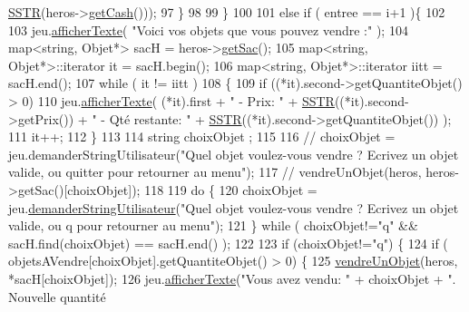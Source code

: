 \begin{DoxyCode}
      \hyperlink{superette_8cpp_a0d2f37137ee1fd6ff4a0ef803849dd63}{SSTR}(heros->\hyperlink{class_heros_a77bdee21cb8c8356448bb6669941441c}{getCash}()));
97             \}
98 
99         \}
100 
101         \textcolor{keywordflow}{else} \textcolor{keywordflow}{if} ( entree == i+1 )\{
102 
103             jeu.\hyperlink{class_jeu_aa09fb40439f16b9665a0d76679f78e4e}{afficherTexte}( \textcolor{stringliteral}{"Voici vos objets que vous pouvez vendre :"} );
104             map<string, Objet*> sacH = heros->\hyperlink{class_heros_a62d8b172e82dbb0a1d2c23da21bdb069}{getSac}();
105             map<string, Objet*>::iterator it = sacH.begin();
106             map<string, Objet*>::iterator iitt = sacH.end();
107             \textcolor{keywordflow}{while} ( it != iitt )
108             \{
109                 \textcolor{keywordflow}{if} ((*it).second->getQuantiteObjet() > 0)
110                     jeu.\hyperlink{class_jeu_aa09fb40439f16b9665a0d76679f78e4e}{afficherTexte}( (*it).first + \textcolor{stringliteral}{" - Prix: "} +  
      \hyperlink{superette_8cpp_a0d2f37137ee1fd6ff4a0ef803849dd63}{SSTR}((*it).second->getPrix())   + \textcolor{stringliteral}{" - Qté restante: "} +  \hyperlink{superette_8cpp_a0d2f37137ee1fd6ff4a0ef803849dd63}{SSTR}((*it).second->getQuantiteObjet()) );
111                 it++;
112             \}
113 
114             \textcolor{keywordtype}{string} choixObjet ;
115 
116 \textcolor{comment}{//          choixObjet = jeu.demanderStringUtilisateur("Quel objet voulez-vous vendre ? Ecrivez un objet
       valide, ou quitter pour retourner au menu");}
117 \textcolor{comment}{//                      vendreUnObjet(heros, heros->getSac()[choixObjet]);}
118 
119             \textcolor{keywordflow}{do} \{
120                 choixObjet = jeu.\hyperlink{class_jeu_a4b70e906117c6a21b989ad3ab672c83c}{demanderStringUtilisateur}(\textcolor{stringliteral}{"Quel objet voulez-vous
       vendre ? Ecrivez un objet valide, ou q pour retourner au menu"});
121             \} \textcolor{keywordflow}{while} ( choixObjet!=\textcolor{stringliteral}{"q"} && sacH.find(choixObjet) == sacH.end() );
122 
123             \textcolor{keywordflow}{if} (choixObjet!=\textcolor{stringliteral}{"q"}) \{
124                 \textcolor{keywordflow}{if} ( objetsAVendre[choixObjet].getQuantiteObjet() > 0) \{
125                     \hyperlink{class_superette_a4d3c1ec385b042f8cd59f7e592a134f2}{vendreUnObjet}(heros, *sacH[choixObjet]);
126                     jeu.\hyperlink{class_jeu_aa09fb40439f16b9665a0d76679f78e4e}{afficherTexte}(\textcolor{stringliteral}{"Vous avez vendu: "} + choixObjet + \textcolor{stringliteral}{". Nouvelle quantité
}
\end{DoxyCode}

